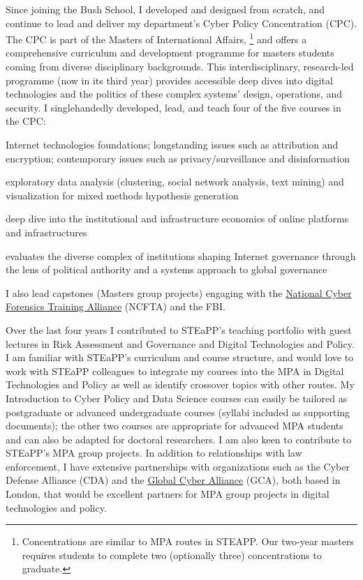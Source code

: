 \documentclass[11pt]{letter}
\begin{document}
\begin{letter}
Since joining the Bush School, I developed and designed from scratch, and continue to lead and deliver my department’s Cyber Policy Concentration (CPC).
%
The CPC is part of the Masters of International Affairs,%
  \footnote{Concentrations are similar to MPA routes in STEAPP.  Our two-year masters requires students to complete two (optionally three) concentrations to graduate.} %
and offers a comprehensive curriculum and development programme for masters students coming from diverse disciplinary backgrounds.
%
This interdisciplinary, research-led programme (now in its third year) provides accessible deep dives into digital technologies and the politics of these complex systems' design, operations, and security.
%
I singlehandedly developed, lead, and teach four of the five courses in the CPC:
%
\begin{description}[leftmargin=0.5cm]
  \item[Introduction to Cyber Policy:] Internet technologies foundations; longstanding issues such as attribution and encryption; contemporary issues such as privacy/surveillance and disinformation

  \item[Data Science and Visualization for Policy Analysis:] exploratory data analysis (clustering, social network analysis, text mining) and visualization for mixed methods hypothesis generation

  \item[Internet Infrastructure: Platforms and Politics:] deep dive into the institutional and infrastructure economics of online platforms and infrastructures

  \item[Advanced Cyber Policy:] evaluates the diverse complex of institutions shaping Internet governance through the lens of political authority and a systems approach to global governance
\end{description}
%
I also lead capstones (Masters group projects) engaging with the \href{https://www.ncfta.net}{National Cyber Forensics Training Alliance} (NCFTA) and the FBI.

Over the last four years I contributed to STEaPP's teaching portfolio with guest lectures in Risk Assessment and Governance and Digital Technologies and Policy.
%
I am familiar with STEaPP's curriculum and course structure, and would love to work with STEaPP colleagues to integrate my courses into the MPA in Digital Technologies and Policy as well as identify crossover topics with other routes.
%
My Introduction to Cyber Policy and Data Science courses can easily be tailored as postgraduate or advanced undergraduate courses (syllabi included as supporting documents); the other two courses are appropriate for advanced MPA students and can also be adapted for doctoral researchers.
%
I am also keen to contribute to STEaPP's MPA group projects.
%
In addition to relationships with law enforcement, I have extensive partnerships with organizations such as the Cyber Defense Alliance (CDA) and the \href{https://www.globalcyberalliance.org/}{Global Cyber Alliance} (GCA), both based in London, that would be excellent partners for MPA group projects in digital technologies and policy.
%


\end{letter}
\end{document}
